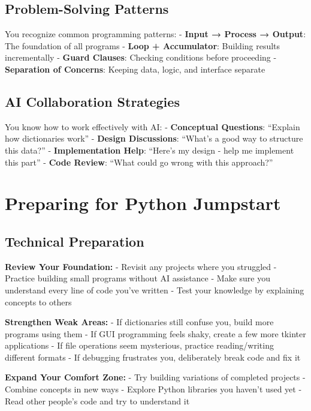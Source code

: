 \documentclass[
  letterpaper,
  DIV=11,
  numbers=noendperiod,
  oneside]{scrreprt}
\begin{document}
\subsection{Problem-Solving Patterns}\label{problem-solving-patterns}

You recognize common programming patterns: - \textbf{Input → Process →
Output}: The foundation of all programs - \textbf{Loop + Accumulator}:
Building results incrementally - \textbf{Guard Clauses}: Checking
conditions before proceeding - \textbf{Separation of Concerns}: Keeping
data, logic, and interface separate

\subsection{AI Collaboration
Strategies}\label{ai-collaboration-strategies}

You know how to work effectively with AI: - \textbf{Conceptual
Questions}: ``Explain how dictionaries work'' - \textbf{Design
Discussions}: ``What's a good way to structure this data?'' -
\textbf{Implementation Help}: ``Here's my design - help me implement
this part'' - \textbf{Code Review}: ``What could go wrong with this
approach?''

\section{Preparing for Python
Jumpstart}\label{preparing-for-python-jumpstart}

\subsection{Technical Preparation}\label{technical-preparation}

\textbf{Review Your Foundation:} - Revisit any projects where you
struggled - Practice building small programs without AI assistance -
Make sure you understand every line of code you've written - Test your
knowledge by explaining concepts to others

\textbf{Strengthen Weak Areas:} - If dictionaries still confuse you,
build more programs using them - If GUI programming feels shaky, create
a few more tkinter applications - If file operations seem mysterious,
practice reading/writing different formats - If debugging frustrates
you, deliberately break code and fix it

\textbf{Expand Your Comfort Zone:} - Try building variations of
completed projects - Combine concepts in new ways - Explore Python
libraries you haven't used yet - Read other people's code and try to
understand it
\end{document}
